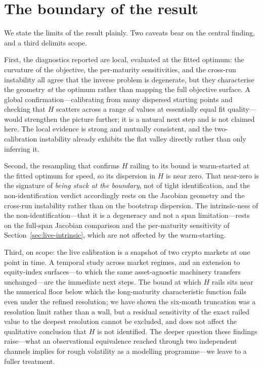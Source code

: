 \documentclass[11pt]{article}
\begin{document}
\section{The boundary of the result}\label{sec:limitations}

We state the limits of the result plainly. Two caveats bear on the central finding, and a third
delimits scope.

First, the diagnostics reported are local, evaluated at the fitted optimum: the curvature of the
objective, the per-maturity sensitivities, and the cross-run instability all agree that the inverse
problem is degenerate, but they characterise the geometry \emph{at} the optimum rather than mapping the full
objective surface. A global confirmation---calibrating from many dispersed starting points and
checking that $H$ scatters across a range of values at essentially equal fit quality---would
strengthen the picture further; it is a natural next step and is not claimed here. The local evidence
is strong and mutually consistent, and the two-calibration instability already exhibits the flat
valley directly rather than only inferring it.

Second, the resampling that confirms $H$ railing to its bound is warm-started at the fitted optimum for
speed, so its dispersion in $H$ is near zero. That near-zero is the signature of \emph{being stuck at
the boundary}, not of tight identification, and the non-identification verdict accordingly rests on the
Jacobian geometry and the cross-run instability rather than on the bootstrap dispersion. The
intrinsic-ness of the non-identification---that it is a degeneracy and not a span limitation---rests on
the full-span Jacobian comparison and the per-maturity sensitivity of Section~\ref{sec:live-intrinsic},
which are not affected by the warm-starting.

Third, on scope: the live calibration is a snapshot of two crypto markets at one point in time. A
temporal study across market regimes, and an extension to equity-index surfaces---to which the same
asset-agnostic machinery transfers unchanged---are the immediate next steps. The bound at which $H$
rails sits near the numerical floor below which the long-maturity characteristic function fails even
under the refined resolution; we have shown the six-month truncation was a resolution limit rather than
a wall, but a residual sensitivity of the exact railed value to the deepest resolution cannot be
excluded, and does not affect the qualitative conclusion that $H$ is not identified. The deeper
question these findings raise---what an observational equivalence reached through two independent
channels implies for rough volatility as a modelling programme---we leave to a fuller treatment.
\end{document}
